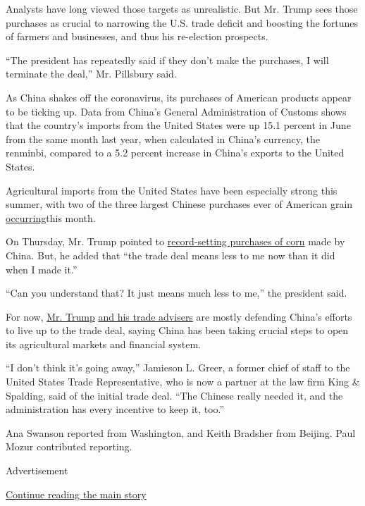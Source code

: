 Analysts have long viewed those targets as unrealistic. But Mr. Trump
sees those purchases as crucial to narrowing the U.S. trade deficit and
boosting the fortunes of farmers and businesses, and thus his
re-election prospects.

``The president has repeatedly said if they don't make the purchases, I
will terminate the deal,'' Mr. Pillsbury said.

As China shakes off the coronavirus, its purchases of American products
appear to be ticking up. Data from China's General Administration of
Customs shows that the country's imports from the United States were up
15.1 percent in June from the same month last year, when calculated in
China's currency, the renminbi, compared to a 5.2 percent increase in
China's exports to the United States.

Agricultural imports from the United States have been especially strong
this summer, with two of the three largest Chinese purchases ever of
American grain
\href{https://www.bloomberg.com/news/articles/2020-07-14/china-books-record-deal-for-u-s-corn-stepping-up-buying-spree}{occurring}this
month.

On Thursday, Mr. Trump pointed to
\href{https://www.fas.usda.gov/newsroom/private-exporters-report-sales-activity-china-251}{record-setting
purchases of corn} made by China. But, he added that ``the trade deal
means less to me now than it did when I made it.''

``Can you understand that? It just means much less to me,'' the
president said.

For now,
\href{https://www.nytimes.com/2020/06/23/business/economy/trump-navarro-china-trade-deal.html}{Mr.
Trump}
\href{https://www.nytimes.com/2020/06/17/business/economy/us-trade-china-tariffs.html}{and
his trade advisers} are mostly defending China's efforts to live up to
the trade deal, saying China has been taking crucial steps to open its
agricultural markets and financial system.

``I don't think it's going away,'' Jamieson L. Greer, a former chief of
staff to the United States Trade Representative, who is now a partner at
the law firm King \& Spalding, said of the initial trade deal. ``The
Chinese really needed it, and the administration has every incentive to
keep it, too.''

Ana Swanson reported from Washington, and Keith Bradsher from Beijing.
Paul Mozur contributed reporting.

Advertisement

\protect\hyperlink{after-bottom}{Continue reading the main story}

